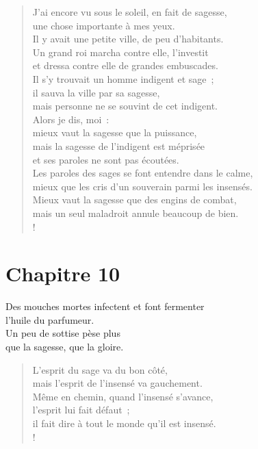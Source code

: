 \documentclass[french,twoside]{book} %
\def\mednobreak{\ifdim\lastskip<\medskipamount
  \removelastskip\nopagebreak\medskip\fi}
\newcommand{\labelblock}[1]{\medbreak{\noindent\color{rubric}\bfseries #1}\par\mednobreak}
\begin{document}
\labelblock{La sagesse méconnue}


\begin{verse}
J’ai encore vu sous le soleil, en fait de sagesse, \\
une chose importante à mes yeux.\\
Il y avait une petite ville, de peu d’habitants. \\
Un grand roi marcha contre elle, l’investit \\
et dressa contre elle de grandes embuscades.\\
Il s’y trouvait un homme indigent et sage ; \\
il sauva la ville par sa sagesse, \\
mais personne ne se souvint de cet indigent.\\
Alors je dis, moi : \\
mieux vaut la sagesse que la puissance, \\
mais la sagesse de l’indigent est méprisée \\
et ses paroles ne sont pas écoutées.\\
Les paroles des sages se font entendre dans le calme, \\
mieux que les cris d’un souverain parmi les insensés.\\
Mieux vaut la sagesse que des engins de combat, \\
mais un seul maladroit annule beaucoup de bien.\\!
\end{verse}
\section[{Chapitre 10}]{Chapitre 10}\renewcommand{\leftmark}{Chapitre 10}

Des mouches mortes infectent et font fermenter \\
l’huile du parfumeur. \\
Un peu de sottise pèse plus \\
que la sagesse, que la gloire.\\

\begin{verse}
L’esprit du sage va du bon côté, \\
mais l’esprit de l’insensé va gauchement.\\
Même en chemin, quand l’insensé s’avance, \\
l’esprit lui fait défaut ; \\
il fait dire à tout le monde qu’il est insensé.\\!
\end{verse}
\end{document}
